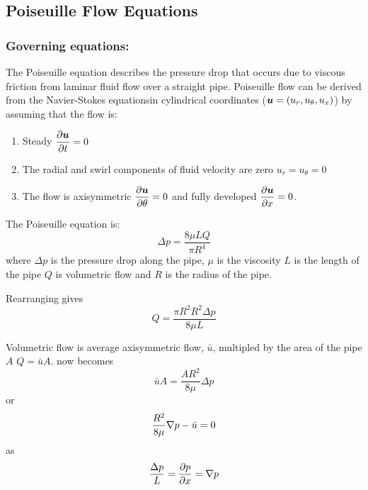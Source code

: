 \subsection{Poiseuille Flow Equations}

\subsubsection{Governing equations:}

The Poiseuille equation describes the pressure drop that occurs due to viscous
friction from laminar fluid flow over a straight pipe. Poiseuille flow can be
derived from the Navier-Stokes equationsin cylindrical coordinates
($\vect{u}=\pbrac{u_{r},u_{\theta},u_{x}}$) by assuming that the flow
is: \begin{enumerate} \setlength{\itemsep}{1pt} \setlength{\parskip}{0pt}
  \setlength{\parsep}{0pt}
\item Steady \ie $\delby{\vect{u}}{t}=0$
\item The radial and swirl components of fluid velocity are zero \ie
  $u_{r}=u_{\theta}=0$ 
\item The flow is axisymmetric \ie $\delby{\vect{u}}{\theta}=0$ and fully developed
  \ie $\delby{\vect{u}}{x}=0$.
\end{enumerate}

The Poiseuille equation is:
\begin{equation}
  \boxed{
    \Delta{p}=\dfrac{8\mu LQ}{\pi R^{4}}
  }
  \label{eqn:Poiseuille_equation}
\end{equation}
where $\Delta{p}$ is the pressure drop along the pipe, $\mu$ is the viscosity $L$
is the length of the pipe $Q$ is volumetric flow and $R$ is the radius of the
pipe. 

Rearranging  gives
\begin{equation}
  Q=\dfrac{\pi R^{2}R^{2}\Delta{p}}{8\mu L}
\end{equation}

Volumetric flow is average axisymmetric flow, $\bar{u}$, multipled by the area
of the pipe $A$ \ie $Q=\bar{u}A$.  now becomes
\begin{equation}
  \bar{u}A=\dfrac{AR^{2}}{8\mu}\Delta{p}
\end{equation}
or 
\begin{equation}
  \dfrac{R^{2}}{8\mu}\nabla p-\bar{u}=0
\end{equation}
as
\begin{equation}
  \dfrac{\Delta p}{L}= \dfrac{\partial p}{\partial x} =\nabla p
\end{equation}

